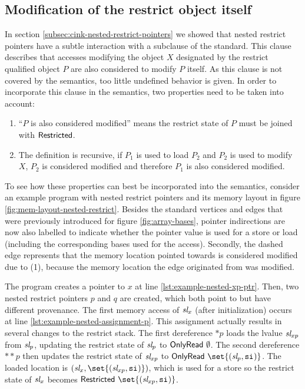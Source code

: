 \newpage

\subsection{Modification of the restrict object itself}\label{subsec:modification-of-the-restrict-object}
In section \ref{subsec:cink-nested-restrict-pointers} we showed that nested restrict pointers 
have a subtle interaction with a subclause of the standard.
This clause describes that accesses modifying the
object $X$ designated by the restrict qualified object $P$ are also considered to modify $P$ itself.
As this clause is not covered by the \cink{} semantics, too little undefined behavior is given.
In order to incorporate this clause in the semantics, two properties need to be taken into account:

\begin{enumerate}
    \item ``$P$ is also considered modified'' means the restrict state of $P$ must be joined with $\mathsf{Restricted}$. 
    \item The definition is recursive, \ie if $P_1$ is used to load $P_2$ and $P_2$ is used to modify $X$,
    $P_2$ is considered modified and therefore $P_1$ is also considered modified.
\end{enumerate}


To see how these properties can best be incorporated into the semantics, consider an example program
with nested restrict pointers and its memory layout in figure \ref{fig:mem-layout-nested-restrict}.
Besides the standard vertices and edges that were previously introduced for figure \ref{fig:array-bases},
pointer indirections are now also labelled to indicate whether the pointer value is used for a 
store or load (including the corresponding bases used for the access).
Secondly, the dashed edge represents that the memory location pointed towards is considered modified due
to (1), \ie because the memory location the edge originated from was modified.

The program creates a pointer  to $x$ at line \ref{lst:example-nested-xp-ptr}.
Then, two nested restrict pointers $p$ and $q$ are created, which both point to 
but have different provenance.
The first memory access of $\textit{sl}_x$ (after initialization) occurs at line \ref{lst:example-nested-assignment-p}.
This assignment actually results in several changes to the restrict stack.
The first dereference $*p$ loads the lvalue $\textit{sl}_{xp}$ from $\textit{sl}_p$, updating the restrict state of $\textit{sl}_p$
to $\mathsf{OnlyRead} \ \emptyset$.
The second dereference $\mathbin{**}p$ then updates the restrict state of $\textit{sl}_{xp}$ to $\onlyread{\set{(\Simplelocvar_{p}, \scope{})}}$.
The loaded location is $(\Simplelocvar_x, \set{(\Simplelocvar_{xp}, \scope{})})$, which is used for a store so the restrict state of $\textit{sl}_x$ becomes
$\restricted{\set{(\Simplelocvar_{xp}, \scope{})}}$.


